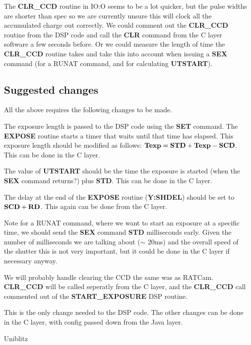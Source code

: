 \documentclass[10pt,a4paper]{article}
\begin{document}
The {\bf CLR\_CCD} routine in IO:O seems to be a lot quicker, but the pulse widths are shorter than spec so we 
are currently unsure this will clock all the accumulated charge out correctly. We could comment out the 
{\bf CLR\_CCD} routine from the DSP code and call the {\bf CLR} command from the C layer software a few seconds before.
Or we could measure the length of time the {\bf CLR\_CCD} routine takes and take this into account when issuing
a {\bf SEX} command (for a RUNAT command, and for calculating {\bf UTSTART}).


\subsection{Suggested changes}

All the above requires the following changes to be made.

The exposure length is passed to the DSP code using the {\bf SET} command. The {\bf EXPOSE} routine starts a timer
that waits until that time has elapsed. This exposure length should be modified as follows:
${\bf Texp} = {\bf STD} + {\bf Texp} - {\bf SCD}$. This can be done in the C layer.

The value of {\bf UTSTART} should be the time the exposure is started (when the {\bf SEX} command returns?)
 plus {\bf STD}. This can be done in the C layer.

The delay at the end of the {\bf EXPOSE} routine ({\bf Y:SHDEL}) should be set to ${\bf SCD} + {\bf RD}$.
This again can be done from the C layer.

Note for a RUNAT command, where we want to start an exposure at a specific time, we should send the
{\bf SEX} command {\bf STD} milliseconds early. Given the number of milliseconds we are talking about ($\sim$ 20ms)
and the overall speed of the shutter this is not very important, but it could be done in the C layer if necessary anyway.

We will probably handle clearing the CCD the same was as RATCam. {\bf CLR\_CCD} will be called seperatly from the 
C layer, and the {\bf CLR\_CCD} call commented out of the {\bf START\_EXPOSURE} DSP routine. 

This is the only change needed to the DSP code. The other changes can be done in the C layer, with
config passed down from the Java layer.

\begin{thebibliography}{99}

Uniblitz 

\end{thebibliography}
\end{document}
